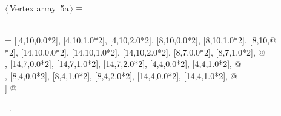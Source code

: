 \documentclass[11pt,oneside]{article}	%
\begin{document}
\begin{flushleft} \small
\begin{minipage}{\linewidth} \label{scrap9}
\protect{}$\langle\,$Vertex array\nobreak\ {\footnotesize 5a}$\,\rangle\equiv$
\vspace{-1ex}
\begin{list}{}{} \item
\mbox{}\verb@@\\
\mbox{}\verb@V = [[4,10,0.0*2], [4,10,1.0*2], [4,10,2.0*2], [8,10,0.0*2], [8,10,1.0*2], [8,10,@\\
\mbox{}*2], [14,10,0.0*2], [14,10,1.0*2], [14,10,2.0*2], [8,7,0.0*2], [8,7,1.0*2], @\\
\mbox{}\verb@[8,7,2.0*2], [14,7,0.0*2], [14,7,1.0*2], [14,7,2.0*2], [4,4,0.0*2], [4,4,1.0*2], @\\
\mbox{}\verb@[4,4,2.0*2], [8,4,0.0*2], [8,4,1.0*2], [8,4,2.0*2], [14,4,0.0*2], [14,4,1.0*2], @\\
\mbox{}\verb@[14,4,2.0*2]] @\\
\mbox{}\verb@@{\NWsep}
\end{list}
\vspace{-1ex}
\footnotesize\addtolength{\baselineskip}{-1ex}
\begin{list}{}{\setlength{\itemsep}{-\parsep}\setlength{\itemindent}{-\leftmargin}}
\item \NWtxtMacroRefIn\ .
\end{list}
\end{minipage}\\[4ex]
\end{flushleft}
\end{document}
